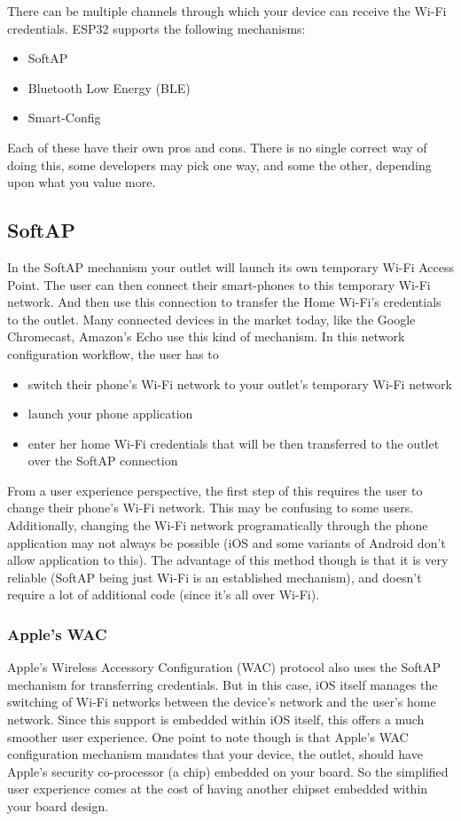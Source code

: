 \documentclass[11pt,fleqn]{book} %
\begin{document}
There can be multiple channels through which your device can receive the Wi-Fi credentials. ESP32 supports the following mechanisms:

\begin{itemize}
    \item SoftAP 
    \item Bluetooth Low Energy (BLE)
    \item Smart-Config
\end{itemize}

Each of these have their own pros and cons. There is no single correct way of doing this, some developers may pick one way, and some the other, depending upon what you value more.

\subsection{SoftAP}
In the SoftAP mechanism your outlet will launch its own temporary Wi-Fi Access Point. The user can then connect their smart-phones to this temporary Wi-Fi network. And then use this connection to transfer the Home Wi-Fi's credentials to the outlet. Many connected devices in the market today, like the Google Chromecast, Amazon's Echo use this kind of mechanism. In this network configuration workflow, the user has to 
\begin{itemize}
    \item switch their phone's Wi-Fi network to your outlet's temporary Wi-Fi network
    \item launch your phone application
    \item enter her home Wi-Fi credentials that will be then transferred to the outlet over the SoftAP connection
\end{itemize}
From a user experience perspective, the first step of this requires the user to change their phone's Wi-Fi network. This may be confusing to some users. Additionally, changing the Wi-Fi network programatically through the phone application may not always be possible (iOS and some variants of Android don't allow application to this). The advantage of this method though is that it is very reliable (SoftAP being just Wi-Fi is an established mechanism), and doesn't require a lot of additional code (since it's all over Wi-Fi).

\subsubsection{Apple's WAC}
Apple's Wireless Accessory Configuration (WAC) protocol also uses the SoftAP mechanism for transferring credentials. But in this case, iOS itself manages the switching of Wi-Fi networks between the device's network and the user's home network. Since this support is embedded within iOS itself, this offers a much smoother user experience.
One point to note though is that Apple's WAC configuration mechanism mandates that your device, the outlet, should have Apple's security co-processor (a chip) embedded on your board. So the simplified user experience comes at the cost of having another chipset embedded within your board design.
\end{document}
